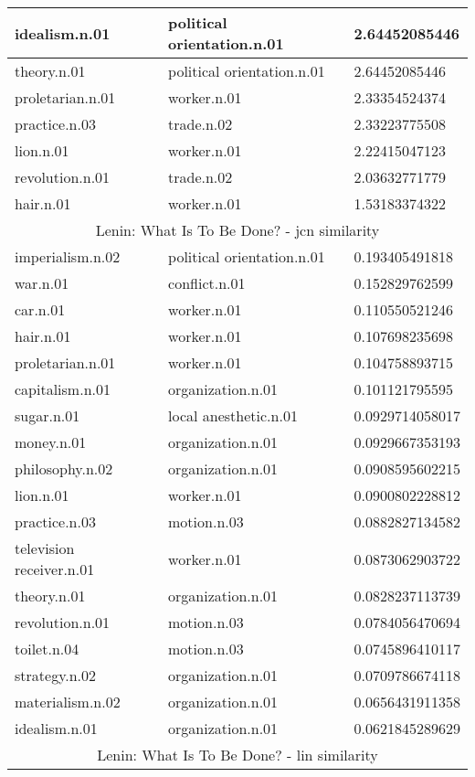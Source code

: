 \begin{center}
\begin{tabular}{ | l | l | l |}
idealism.n.01 & political orientation.n.01 & 2.64452085446\\ \hline
theory.n.01 & political orientation.n.01 & 2.64452085446\\ \hline
proletarian.n.01 & worker.n.01 & 2.33354524374\\ \hline
practice.n.03 & trade.n.02 & 2.33223775508\\ \hline
lion.n.01 & worker.n.01 & 2.22415047123\\ \hline
revolution.n.01 & trade.n.02 & 2.03632771779\\ \hline
hair.n.01 & worker.n.01 & 1.53183374322\\ \hline
\multicolumn{3}{|c|}{Lenin: What Is To Be Done? - jcn similarity} \\ \hline
imperialism.n.02 & political orientation.n.01 & 0.193405491818\\ \hline
war.n.01 & conflict.n.01 & 0.152829762599\\ \hline
car.n.01 & worker.n.01 & 0.110550521246\\ \hline
hair.n.01 & worker.n.01 & 0.107698235698\\ \hline
proletarian.n.01 & worker.n.01 & 0.104758893715\\ \hline
capitalism.n.01 & organization.n.01 & 0.101121795595\\ \hline
sugar.n.01 & local anesthetic.n.01 & 0.0929714058017\\ \hline
money.n.01 & organization.n.01 & 0.0929667353193\\ \hline
philosophy.n.02 & organization.n.01 & 0.0908595602215\\ \hline
lion.n.01 & worker.n.01 & 0.0900802228812\\ \hline
practice.n.03 & motion.n.03 & 0.0882827134582\\ \hline
television receiver.n.01 & worker.n.01 & 0.0873062903722\\ \hline
theory.n.01 & organization.n.01 & 0.0828237113739\\ \hline
revolution.n.01 & motion.n.03 & 0.0784056470694\\ \hline
toilet.n.04 & motion.n.03 & 0.0745896410117\\ \hline
strategy.n.02 & organization.n.01 & 0.0709786674118\\ \hline
materialism.n.02 & organization.n.01 & 0.0656431911358\\ \hline
idealism.n.01 & organization.n.01 & 0.0621845289629\\ \hline
\multicolumn{3}{|c|}{Lenin: What Is To Be Done? - lin similarity} \\ \hline

\end{tabular}
\end{center}
